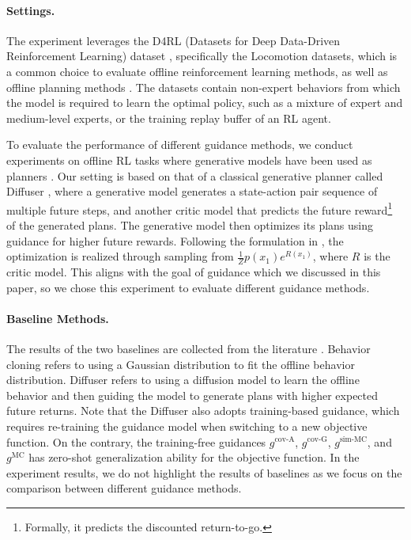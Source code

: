 \paragraph{Settings.}
The experiment leverages the D4RL (Datasets for Deep Data-Driven Reinforcement Learning) dataset \citep{d4rl}, specifically the Locomotion datasets, which is a common choice to evaluate offline reinforcement learning methods, as well as offline planning methods \citep{janner_planning_2022,dou_diffusion_2023}. The datasets contain non-expert behaviors from which the model is required to learn the optimal policy, such as a mixture of expert and medium-level experts, or the training replay buffer of an RL agent.


To evaluate the performance of different guidance methods, we conduct experiments on offline RL tasks where generative models have been used as planners \citep{janner_planning_2022,chen_flow_2024}. Our setting is based on that of a classical generative planner called Diffuser \citep{janner_planning_2022}, where a generative model generates a state-action pair sequence of multiple future steps, and another critic model that predicts the future reward\footnote{Formally, it predicts the discounted return-to-go.} of the generated plans. The generative model then optimizes its plans using guidance for higher future rewards. Following the formulation in \citet{levine_reinforcement_2018,janner_planning_2022}, the optimization is realized through sampling from $\frac{1}{Z}p(x_1)e^{R(x_1)}$, where $R$ is the critic model. This aligns with the goal of guidance which we discussed in this paper, so we chose this experiment to evaluate different guidance methods.

\paragraph{Baseline Methods.}
The results of the two baselines are collected from the literature \citep{janner_planning_2022}. 
Behavior cloning refers to using a Gaussian distribution to fit the offline behavior distribution. Diffuser refers to using a diffusion model to learn the offline behavior and then guiding the model to generate plans with higher expected future returns.
Note that the Diffuser also adopts training-based guidance, which requires re-training the guidance model when switching to a new objective function. On the contrary, the training-free guidances $g^{\text{cov-A}}$, $g^{\text{cov-G}}$, $g^{\text{sim-MC}}$, and $g^{\text{MC}}$ has zero-shot generalization ability for \citep{zhou_diffusion_2024} the objective function. In the experiment results, we do not highlight the results of baselines as we focus on the comparison between different guidance methods.

